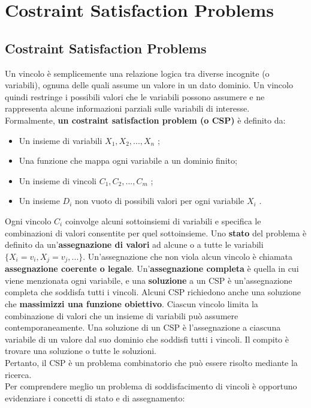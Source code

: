 \chapter{Costraint Satisfaction Problems} \label{ch:Costraint Satisfaction Problems}
\section{Costraint Satisfaction Problems}
Un vincolo è semplicemente una relazione logica tra diverse incognite (o variabili), ognuna delle quali assume un valore in un dato dominio. Un vincolo quindi restringe i possibili valori che le variabili possono assumere e ne rappresenta alcune informazioni parziali sulle variabili di interesse. 
\\Formalmente, \textbf{un costraint satisfaction problem (o CSP)} è definito da:
\begin{itemize}
    \item Un insieme di variabili $X_1, X_2, ... , X_n$ ;
    \item Una funzione che mappa ogni variabile a un dominio finito;
    \item Un insieme di vincoli $C_1, C_2, ... , C_m$ ;
    \item Un insieme $D_i$ non vuoto di possibili valori per ogni variabile $X_i$ .
\end{itemize}
Ogni vincolo $C_i$ coinvolge alcuni sottoinsiemi di variabili e specifica le combinazioni
di valori consentite per quel sottoinsieme. Uno \textbf{stato} del problema è definito da
un’\textbf{assegnazione di valori }ad alcune o a tutte le variabili $\{X_i = v_i , X_j = v_j, ... \}.$
Un’assegnazione che non viola alcun vincolo è chiamata \textbf{assegnazione coerente o
legale}. Un’\textbf{assegnazione completa} è quella in cui viene menzionata ogni variabile, e una \textbf{soluzione} a un CSP è un’assegnazione completa che soddisfa tutti i vincoli. Alcuni CSP richiedono anche una soluzione che \textbf{massimizzi una funzione obiettivo}. Ciascun vincolo limita la combinazione di valori che un insieme di variabili può assumere contemporaneamente. Una soluzione di un CSP è l’assegnazione a ciascuna variabile di un valore dal suo dominio che soddisfi tutti i vincoli. Il compito è trovare una soluzione o tutte le soluzioni. 
\\
Pertanto, il CSP è un problema combinatorio che può essere risolto mediante la ricerca.
\\
Per comprendere meglio un problema di soddisfacimento di vincoli è opportuno evidenziare i concetti di stato e di assegnamento:
